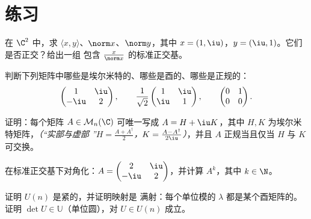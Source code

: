 \section{练习}

\begin{exercise}[$\star$]\label{exo:b2:hermitian:1}
在 $\C^2$ 中，求 $\langle x, y\rangle$、$\norm x$、$\norm y$，其中
$x = (1, \iu)$，$y = (\iu, 1)$。它们是否正交？给出一组
包含 $\frac{x}{\norm x}$ 的标准正交基。
\end{exercise}

\begin{exercise}[$\star$]\label{exo:b2:hermitian:2}
判断下列矩阵中哪些是埃尔米特的、哪些是酉的、哪些是正规的：
\[
\begin{pmatrix} 1 & \iu\\ -\iu & 2 \end{pmatrix},
\qquad
\frac{1}{\sqrt2}\begin{pmatrix} 1 & \iu\\ \iu & 1\end{pmatrix},
\qquad
\begin{pmatrix} 0 & 1\\ 0 & 0 \end{pmatrix}.
\]
\end{exercise}

\begin{exercise}[$\star$]\label{exo:b2:hermitian:3}
证明：每个矩阵 $A \in \mathcal{M}_n(\C)$ 可唯一写成 $A =
H + \iu K$，其中 $H, K$ 为埃尔米特矩阵，\emph{（“实部与虚部
”$H = \frac{A + A^\dagger}{2}$，$K = \frac{A -
A^\dagger}{2\iu}$）}，并且 $A$ 正规当且仅当 $H$ 与 $K$
可交换。
\end{exercise}

\begin{exercise}[$\star\star$]\label{exo:b2:hermitian:4}
在标准正交基下对角化：$A = \begin{pmatrix} 2 & \iu\\
-\iu & 2\end{pmatrix}$，并计算 $A^k$，其中 $k \in \N$。
\end{exercise}

\begin{exercise}[$\star\star$]\label{exo:b2:hermitian:5}
证明 $U(n)$ 是紧的，并证明映射是
满射：每个单位模的 $\lambda$ 都是某个酉矩阵的。
证明 $\det U \in \mathbb{U}$（单位圆），对 $U \in
U(n)$ 成立。
\end{exercise}

